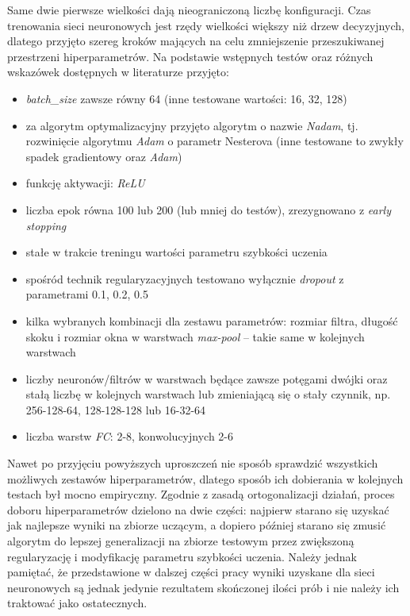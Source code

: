 Same dwie pierwsze wielkości dają nieograniczoną liczbę konfiguracji. 
Czas trenowania sieci neuronowych jest rzędy wielkości większy niż drzew decyzyjnych, dlatego przyjęto szereg kroków mających na celu zmniejszenie przeszukiwanej przestrzeni hiperparametrów. Na podstawie wstępnych testów oraz różnych wskazówek dostępnych w literaturze przyjęto:
\begin{itemize}
	\item \textit{batch\_size} zawsze równy 64 (inne testowane wartości: 16, 32, 128)
	\item za algorytm optymalizacyjny przyjęto algorytm o nazwie \textit{Nadam}, tj. rozwinięcie algorytmu \textit{Adam} o parametr Nesterova (inne testowane to zwykły spadek gradientowy oraz \textit{Adam})
	\item funkcję aktywacji: \textit{ReLU}
	\item liczba epok równa 100 lub 200 (lub mniej do testów), zrezygnowano z \textit{early stopping}
	\item stałe w trakcie treningu wartości parametru szybkości uczenia 
	\item spośród technik regularyzacyjnych testowano wyłącznie \textit{dropout} z parametrami 0.1, 0.2, 0.5
	\item kilka wybranych kombinacji dla zestawu parametrów: rozmiar filtra, długość skoku i rozmiar okna w warstwach \textit{max-pool} -- takie same w kolejnych warstwach
	\item liczby neuronów/filtrów w warstwach będące zawsze potęgami dwójki oraz stałą liczbę w kolejnych warstwach lub zmieniającą się o stały czynnik, np. 256-128-64, 128-128-128 lub 16-32-64
	\item liczba warstw \textit{FC}: 2-8, konwolucyjnych 2-6
\end{itemize}

Nawet po przyjęciu powyższych uproszczeń nie sposób sprawdzić wszystkich możliwych zestawów hiperparametrów, dlatego sposób ich dobierania w kolejnych testach był mocno empiryczny. 
Zgodnie z zasadą ortogonalizacji działań, proces doboru hiperparametrów dzielono na dwie części: najpierw starano się uzyskać jak najlepsze wyniki na zbiorze uczącym, a dopiero później starano się zmusić algorytm do lepszej generalizacji na zbiorze testowym przez zwiększoną regularyzację i modyfikację parametru szybkości uczenia. 
Należy jednak pamiętać, że przedstawione w dalszej części pracy wyniki uzyskane dla sieci neuronowych są jednak jedynie rezultatem skończonej ilości prób i nie należy ich traktować jako ostatecznych.






%
%


